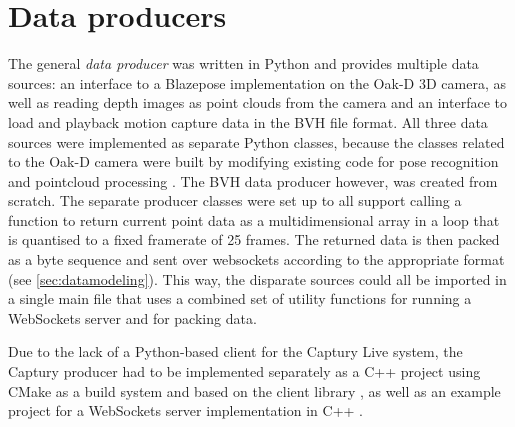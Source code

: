 \section{Data producers}

The general \emph{data producer} was written in Python and provides multiple data sources: an interface to a Blazepose implementation on the Oak-D \ac{3D} camera, as well as reading depth images as point clouds from the camera and an interface to load and playback motion capture data in the \ac{BVH} file format.
All three data sources were implemented as separate Python classes, because the classes related to the Oak-D camera were built by modifying existing code for pose recognition \parencite{githubDepthAiBlazePose} and pointcloud processing \parencite{githubDepthAiPointcloud}.
The \ac{BVH} data producer however, was created from scratch.
The separate producer classes were set up to all support calling a function to return current point data as a multidimensional array in a loop that is quantised to a fixed framerate of 25 frames.
The returned data is then packed as a byte sequence and sent over websockets according to the appropriate format (see \autoref{sec:datamodeling}).
This way, the disparate sources could all be imported in a single main file that uses a combined set of utility functions for running a WebSockets server and for packing data.

Due to the lack of a Python-based client for the Captury Live system, the Captury producer had to be implemented separately as a C++ project using CMake as a build system and based on the  client library \parencite{githubRemoteCaptury}, as well as an example project for a WebSockets server implementation in C++ \parencite{githubCppWebSocketsDemo}.

